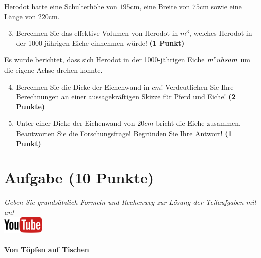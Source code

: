 \documentclass[a4paper, 9pt]{scrartcl}\usepackage[]{graphicx}\usepackage[]{xcolor}
\begin{document}
Herodot hatte eine Schulterh{\"o}he von $195$cm, eine Breite von
$75$cm sowie eine L{\"a}nge von  $220$cm.

\begin{enumerate}
  \setcounter{enumi}{2}
\item Berechnen Sie das effektive Volumen von Herodot in $m^3$, welches
  Herodot in der 1000-j{\"a}hrigen Eiche einnehmen w{\"u}rde! \textbf{(1 Punkt)}
\end{enumerate}

Es wurde berichtet, dass sich Herodot in der 1000-j{\"a}hrigen Eiche
$m{"u}hsam$ um die eigene Achse drehen konnte.

\begin{enumerate}
  \setcounter{enumi}{3}
\item Berechnen Sie die Dicke der Eichenwand in $cm$! Verdeutlichen Sie Ihre
  Berechnungen an einer aussagekr{\"a}ftigen Skizze f{\"u}r Pferd und Eiche! \textbf{(2 Punkte)} 
\item Unter einer Dicke der Eichenwand von $20cm$ bricht
  die Eiche zusammen. Beantworten Sie die Forschungsfrage! Begr{\"u}nden Sie
  Ihre Antwort! \textbf{(1 Punkt)} 
\end{enumerate}
 
\clearpage

\section{Aufgabe \hfill (10 Punkte)}

\textit{Geben Sie grunds{\"a}tzlich Formeln und Rechenweg zur L{\"o}sung der
  Teilaufgaben mit an!} \\[1Ex]

\hfill\href{https://youtu.be/57B-yYoFSk0}{\includegraphics[width =
  2cm]{img/youtube}} %
\hspace{2Ex}

\paragraph{Von T{\"o}pfen auf Tischen}
\end{document}
